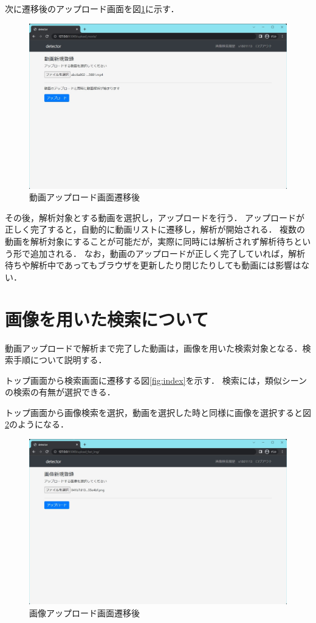 \documentclass[a4j,12pt,dvipdfmx]{jreport}
\begin{document}
次に遷移後のアップロード画面を図\ref{fig:movie_upload}に示す．

\begin{figure}[H]
  \centering
  \includegraphics[width=13cm]{image/movie_upload.jpg}
  \caption{動画アップロード画面遷移後}
  \label{fig:movie_upload}
\end{figure}

その後，解析対象とする動画を選択し，アップロードを行う．
アップロードが正しく完了すると，自動的に動画リストに遷移し，解析が開始される．
複数の動画を解析対象にすることが可能だが，実際に同時には解析されず解析待ちという形で追加される．
なお，動画のアップロードが正しく完了していれば，解析待ちや解析中であってもブラウザを更新したり閉じたりしても動画には影響はない．

\section{画像を用いた検索について}
動画アップロードで解析まで完了した動画は，画像を用いた検索対象となる．検索手順について説明する．

トップ画面から検索画面に遷移する図\ref{fig:index}を示す．
検索には，類似シーンの検索の有無が選択できる．

トップ画面から画像検索を選択，動画を選択した時と同様に画像を選択すると図\ref{fig:image_upload}のようになる．

\begin{figure}[H]
  \centering
  \includegraphics[width=13cm]{image/image_upload.jpg}
  \caption{画像アップロード画面遷移後}
  \label{fig:image_upload}
\end{figure}
\end{document}
